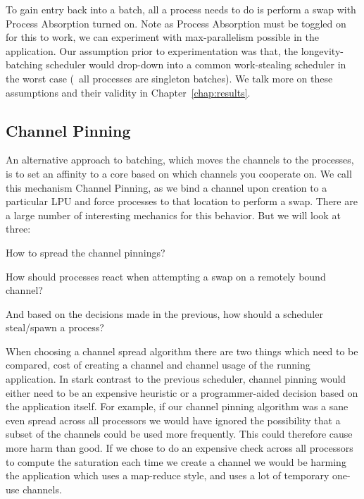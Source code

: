 To gain entry back into a batch, all a process needs to do is perform a swap 
with Process Absorption turned on. Note as Process Absorption must be toggled
on for this to work, we can experiment with max-parallelism possible in the 
application. Our assumption prior to experimentation was that, the 
longevity-batching scheduler would drop-down into a common work-stealing
scheduler in the worst case (\ie~all processes are singleton batches). We talk 
more on these assumptions and their validity in Chapter~\ref{chap:results}.


\subsection{Channel Pinning}\label{sec:channel pinning}

An alternative approach to batching, which moves the channels to the processes,
is to set an affinity to a core based on which channels you cooperate on. We 
call this mechanism Channel Pinning, as we bind a channel upon creation to a
particular LPU and force processes to that location to perform a swap. 
There are a large number of interesting mechanics for this behavior. But we 
will look at three: 
\begin{inparaenum}
\item How to spread the channel pinnings?
\item How should processes react when attempting a swap on a remotely bound channel?
\item And based on the decisions made in the previous, how should a scheduler steal/spawn a process?
\end{inparaenum}

When choosing a channel spread algorithm there are two things which need to be
compared, cost of creating a channel and channel usage of the running application. 
In stark contrast to the previous scheduler, channel
pinning would either need to be an expensive heuristic or a programmer-aided
decision based on the application itself.
For example, if our channel pinning algorithm was a sane even spread across all
processors we would have ignored the possibility that a subset of the channels
could be used more frequently. This could therefore cause more harm than good.
If we chose to do an expensive check across all processors to compute the 
saturation each time we create a channel we would be harming the application 
which uses a map-reduce style, and uses a lot of temporary one-use channels.

